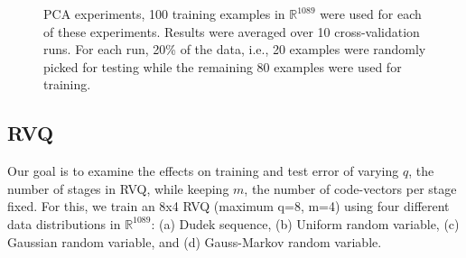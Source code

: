 \begin{figure}
\caption{PCA experiments, 100 training examples in $\mathbb{R}^{1089}$ were used for each of these experiments.  Results were averaged over 10 cross-validation runs.  For each run, 20\% of the data, i.e., 20 examples were randomly picked for testing while the remaining 80 examples were used for training.}
\label{fig:PCA_results}
\end{figure}

\subsection{RVQ}
Our goal is to examine the effects on training and test error of varying $q$, the number of stages in RVQ, while keeping $m$, the number of code-vectors per stage fixed.  For this, we train an 8x4 RVQ (maximum q=8, m=4) using four different data distributions in $\mathbb{R}^{1089}$: (a) Dudek sequence, (b) Uniform random variable, (c) Gaussian random variable, and (d) Gauss-Markov random variable.


